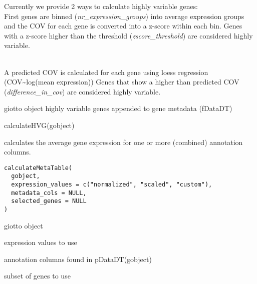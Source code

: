 \documentclass[a4paper]{book}
\begin{document}
%
\begin{Details}\relax
Currently we provide 2 ways to calculate highly variable genes:
 \\{}
First genes are binned (\emph{nr\_expression\_groups}) into average expression groups and
the COV for each gene is converted into a z-score within each bin. Genes with a z-score
higher than the threshold (\emph{zscore\_threshold}) are considered highly variable.  \\{}

 \\{}
A predicted COV is calculated for each gene using loess regression (COV\textasciitilde{}log(mean expression))
Genes that show a higher than predicted COV (\emph{difference\_in\_cov}) are considered highly variable. \\{}
\end{Details}
%
\begin{Value}
giotto object highly variable genes appended to gene metadata (fDataDT)
\end{Value}
%
\begin{Examples}
\begin{ExampleCode}
    calculateHVG(gobject)
\end{ExampleCode}
\end{Examples}
%
\begin{Description}\relax
calculates the average gene expression for one or more (combined) annotation columns.
\end{Description}
%
\begin{Usage}
\begin{verbatim}
calculateMetaTable(
  gobject,
  expression_values = c("normalized", "scaled", "custom"),
  metadata_cols = NULL,
  selected_genes = NULL
)
\end{verbatim}
\end{Usage}
%
\begin{Arguments}
\begin{ldescription}
\item[\code{gobject}] giotto object

\item[\code{expression\_values}] expression values to use

\item[\code{metadata\_cols}] annotation columns found in pDataDT(gobject)

\item[\code{selected\_genes}] subset of genes to use
\end{ldescription}
\end{Arguments}
\end{document}
